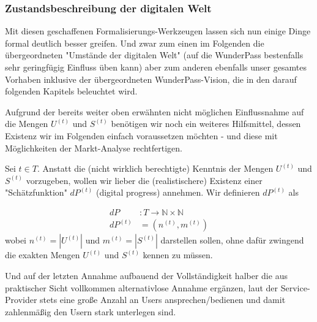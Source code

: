 \subsubsection{Zustandsbeschreibung der digitalen Welt}
\label{sec:eco_zahlen_zustand_digitalisierung}

Mit diesen geschaffenen Formalisierungs-Werkzeugen lassen sich nun einige Dinge formal deutlich besser greifen. Und zwar zum einen im Folgenden die übergeordneten "Umstände der digitalen Welt" (auf die WunderPass bestenfalls sehr geringfügig Einfluss üben kann) aber zum anderen ebenfalls unser gesamtes Vorhaben inklusive der übergeordneten WunderPass-Vision, die in den darauf folgenden Kapitels beleuchtet wird. 

\vspace{0.3cm}

Aufgrund der bereits weiter oben erwähnten nicht möglichen Einflussnahme auf die Mengen $U^{(t)}$ und $S^{(t)}$ benötigen wir noch ein weiteres Hilfsmittel, dessen Existenz wir im Folgenden einfach voraussetzen möchten - und diese mit Möglichkeiten der Markt-Analyse rechtfertigen.

\vspace{0.3cm}

\begin{Assumption}\label{assumptionOrakel}

Sei $t \in T$. Anstatt die (nicht wirklich berechtigte) Kenntnis der Mengen $U^{(t)}$ und $S^{(t)}$ vorzugeben, wollen wir lieber die (realistischere) Existenz einer "Schätzfunktion" $dP^{(t)}$ (digital progress) annehmen. Wir definieren $dP^{(t)}$ als

\begin{align*}
dP &: T \rightarrow \mathbb{N} \times \mathbb{N}  \\
dP^{(t)} &= \left(n^{(t)}, m^{(t)}\right)
\end{align*}
wobei $n^{(t)} = |U^{(t)}|$ und $m^{(t)} = |S^{(t)}|$ darstellen sollen, ohne dafür zwingend die exakten Mengen $U^{(t)}$ und $S^{(t)}$ kennen zu müssen.

\end{Assumption}

\vspace{0.3cm}


\vspace{0.3cm}

Und auf der letzten Annahme aufbauend der Vollständigkeit halber die aus praktischer Sicht vollkommen alternativlose Annahme ergänzen, laut der Service-Provider stets eine große Anzahl an Users ansprechen/bedienen und damit zahlenmäßig den Usern stark unterlegen sind.
\vspace{0.3cm}

